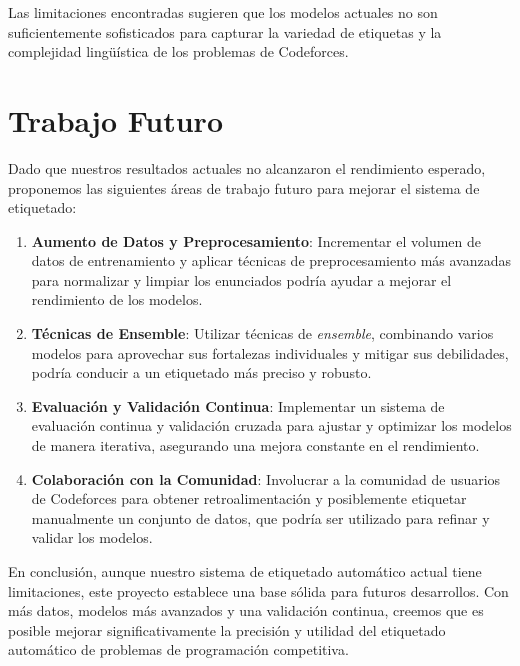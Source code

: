 \documentclass{article}
\begin{document}
Las limitaciones encontradas sugieren que los modelos actuales no son suficientemente sofisticados para capturar la variedad de etiquetas y la complejidad lingüística de los problemas de Codeforces.

\section{Trabajo Futuro}

Dado que nuestros resultados actuales no alcanzaron el rendimiento esperado, proponemos las siguientes áreas de trabajo futuro para mejorar el sistema de etiquetado:

\begin{enumerate}
    \item \textbf{Aumento de Datos y Preprocesamiento}: Incrementar el volumen de datos de entrenamiento y aplicar técnicas de preprocesamiento más avanzadas para normalizar y limpiar los enunciados podría ayudar a mejorar el rendimiento de los modelos.
    \item \textbf{Técnicas de Ensemble}: Utilizar técnicas de \textit{ensemble}, combinando varios modelos para aprovechar sus fortalezas individuales y mitigar sus debilidades, podría conducir a un etiquetado más preciso y robusto.
    \item \textbf{Evaluación y Validación Continua}: Implementar un sistema de evaluación continua y validación cruzada para ajustar y optimizar los modelos de manera iterativa, asegurando una mejora constante en el rendimiento.
    \item \textbf{Colaboración con la Comunidad}: Involucrar a la comunidad de usuarios de Codeforces para obtener retroalimentación y posiblemente etiquetar manualmente un conjunto de datos, que podría ser utilizado para refinar y validar los modelos.
\end{enumerate}

En conclusión, aunque nuestro sistema de etiquetado automático actual tiene limitaciones, este proyecto establece una base sólida para futuros desarrollos. Con más datos, modelos más avanzados y una validación continua, creemos que es posible mejorar significativamente la precisión y utilidad del etiquetado automático de problemas de programación competitiva.
\end{document}
